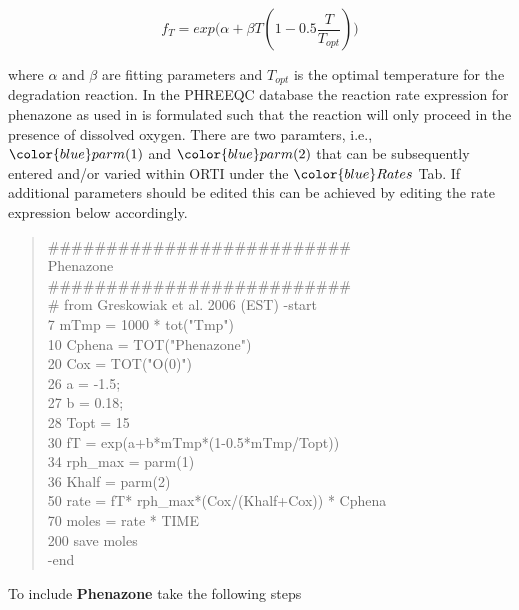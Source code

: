 \begin{equation}
{f_{T} = exp({\alpha + \beta T (1 - 0.5 {\frac{T}{T_{opt}}})  )}}
\label{eq:temp_dep}
\end{equation}

where $\alpha$ and $\beta$ are fitting parameters and $T_{opt}$ is the optimal
temperature for the degradation reaction. In the PHREEQC database 
the reaction rate expression for phenazone 
as used in  \cite{greskowiak_2006} is formulated such that  the reaction 
will only proceed in the presence of dissolved oxygen.
There are two paramters, i.e., ${\color{blue} parm(1)}$
and ${\color{blue} parm(2)}$ that can be subsequently entered and/or varied 
within ORTI under the ${\color{blue} Rates}$ Tab. If additional parameters 
should be edited this can be achieved by editing the 
rate expression below accordingly. 

{\color{red}
\begin{quote}
\#\#\#\#\#\#\#\#\#\#\#\#\#\#\#\#\#\#\#\#\#\#\#\#\#\#\\
Phenazone \\
\#\#\#\#\#\#\#\#\#\#\#\#\#\#\#\#\#\#\#\#\#\#\#\#\#\#\\
\# from Greskowiak et al. 2006 (EST)
-start \\
 7 mTmp   = 1000 * tot("Tmp") \\
10  Cphena = TOT("Phenazone") \\
20  Cox = TOT("O(0)") \\
26  a = -1.5; \\
27  b = 0.18; \\
28  Topt = 15 \\
30  fT = exp(a+b*mTmp*(1-0.5*mTmp/Topt)) \\
34  rph\_max = parm(1) \\
36  Khalf = parm(2) \\
50  rate = fT* rph\_max*(Cox/(Khalf+Cox)) * Cphena \\
70 moles = rate * TIME \\
200 save moles \\
-end \\
\end{quote}}

To include {\color{red} \textbf{Phenazone}} take the following steps 

